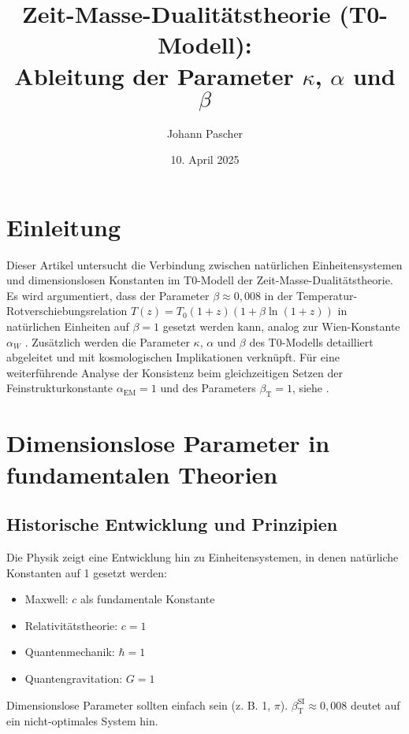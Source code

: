 \documentclass[12pt,a4paper]{article}
\newcommand{\alphaEM}{\alpha_{\text{EM}}}
\newcommand{\betaT}{\beta_{\text{T}}}
\begin{document}
	
	\title{Zeit-Masse-Dualitätstheorie (T0-Modell): \\ Ableitung der Parameter \(\kappa\), \(\alpha\) und \(\beta\)}
	\author{Johann Pascher}
	\date{10. April 2025}
	
	\maketitle
	
	\section*{Einleitung}
	
	Dieser Artikel untersucht die Verbindung zwischen natürlichen Einheitensystemen und dimensionslosen Konstanten im T0-Modell der Zeit-Masse-Dualitätstheorie. Es wird argumentiert, dass der Parameter \(\beta \approx 0{,}008\) in der Temperatur-Rotverschiebungsrelation \(T(z) = T_0 (1+z)(1+\beta\ln(1+z))\) in natürlichen Einheiten auf \(\beta = 1\) gesetzt werden kann, analog zur Wien-Konstante \(\alpha_W\) \cite{pascher_temp_2025}. Zusätzlich werden die Parameter \(\kappa\), \(\alpha\) und \(\beta\) des T0-Modells detailliert abgeleitet und mit kosmologischen Implikationen verknüpft. Für eine weiterführende Analyse der Konsistenz beim gleichzeitigen Setzen der Feinstrukturkonstante \(\alphaEM = 1\) und des Parameters \(\betaT = 1\), siehe \cite{pascher_alphabeta_2025}.
	
	\tableofcontents
	\newpage
	
	\section{Dimensionslose Parameter in fundamentalen Theorien}
	
	\subsection{Historische Entwicklung und Prinzipien}
	
	Die Physik zeigt eine Entwicklung hin zu Einheitensystemen, in denen natürliche Konstanten auf 1 gesetzt werden:
	\begin{itemize}
		\item Maxwell: \(c\) als fundamentale Konstante
		\item Relativitätstheorie: \(c = 1\)
		\item Quantenmechanik: \(\hbar = 1\)
		\item Quantengravitation: \(G = 1\)
	\end{itemize}
	Dimensionslose Parameter sollten einfach sein (z. B. 1, \(\pi\)). \(\betaT^{\text{SI}} \approx 0{,}008\) deutet auf ein nicht-optimales System hin.
	
\end{document}
